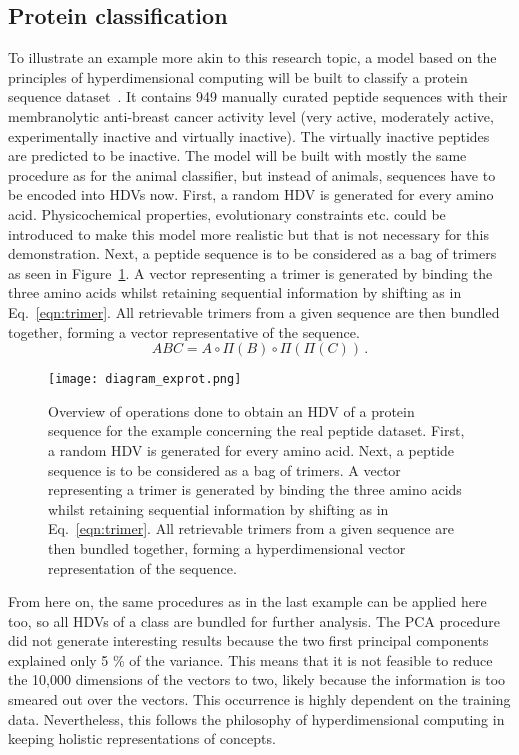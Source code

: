 \subsection*{Protein classification}
\label{ssec:protclas}
To illustrate an example more akin to this research topic, a model based on the principles of hyperdimensional computing will be built to classify a protein sequence dataset~\cite{anticancer}. It contains 949 manually curated peptide sequences with their membranolytic anti-breast cancer activity level (very active, moderately active, experimentally inactive and virtually inactive). The virtually inactive peptides are predicted to be inactive. The model will be built with mostly the same procedure as for the animal classifier, but instead of animals, sequences have to be encoded into HDVs now. First, a random HDV is generated for every amino acid. Physicochemical properties, evolutionary constraints etc. could be introduced to make this model more realistic but that is not necessary for this demonstration. Next, a peptide sequence is to be considered as a bag of trimers as seen in Figure~\ref{fig:diagram_exprot5}. A vector representing a trimer is generated by binding the three amino acids whilst retaining sequential information by shifting as in Eq.~\ref{eqn:trimer}. All retrievable trimers from a given sequence are then bundled together, forming a vector representative of the sequence. 
\begin{equation}\label{eqn:trimer}
    ABC = A \circ \Pi (B) \circ \Pi (\Pi (C))\,.
\end{equation}
\begin{figure}[h!]
    \centering
    \texttt{[image: diagram\_exprot.png]}
    \caption{Overview of operations done to obtain an HDV of a protein sequence for the example concerning the real peptide dataset. First, a random HDV is generated for every amino acid. Next, a peptide sequence is to be considered as a bag of trimers. A vector representing a trimer is generated by binding the three amino acids whilst retaining sequential information by shifting as in Eq.~\ref{eqn:trimer}. All retrievable trimers from a given sequence are then bundled together, forming a hyperdimensional vector representation of the sequence.}
    \label{fig:diagram_exprot5}
\end{figure}
From here on, the same procedures as in the last example can be applied here too, so all HDVs of a class are bundled for further analysis. The PCA procedure did not generate interesting results because the two first principal components explained only 5 \% of the variance. This means that it is not feasible to reduce the 10,000 dimensions of the vectors to two, likely because the information is too smeared out over the vectors. This occurrence is highly dependent on the training data. Nevertheless, this follows the philosophy of hyperdimensional computing in keeping holistic representations of concepts.

